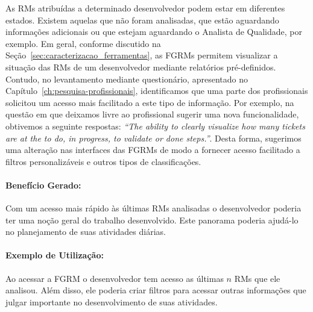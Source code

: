 As RMs atribuídas a determinado desenvolvedor podem estar em diferentes estados.
Existem aquelas que não foram analisadas, que estão aguardando informações
adicionais ou que estejam aguardando o Analista de Qualidade, por exemplo. Em
geral, conforme discutido na Seção~\ref{sec:caracterizacao_ferramentas}, as
FGRMs permitem visualizar a situação das RMs de um desenvolvedor mediante
relatórios pré-definidos. Contudo, no levantamento mediante questionário,
apresentado no Capítulo~\ref{ch:pesquisa-profissionais}, identificamos que uma
parte dos profissionais solicitou um acesso mais facilitado a este tipo de
informação. Por exemplo, na questão em que deixamos livre ao profissional
sugerir uma nova funcionalidade, obtivemos a seguinte respostas:  \textit{``The
    ability to clearly visualize how many tickets are at the to do, in
    progress, to validate or done steps.''}. Desta forma, sugerimos uma
alteração nas interfaces das FGRMs de modo a fornecer acesso facilitado a
filtros personalizáveis e outros tipos de classificações.


\paragraph{Benefício Gerado:}\label{par:papéis_afetados_s04}

Com um acesso mais rápido às últimas RMs analisadas o desenvolvedor poderia ter
uma noção geral do trabalho desenvolvido. Este panorama poderia ajudá-lo no
planejamento de suas atividades diárias.

\paragraph{Exemplo de Utilização:}\label{par:exemplo_de_utilização_s04}

Ao acessar a FGRM o desenvolvedor tem acesso as últimas $n$ RMs que ele
analisou. Além disso, ele poderia criar filtros para acessar outras informações
que julgar importante no desenvolvimento de suas atividades.

